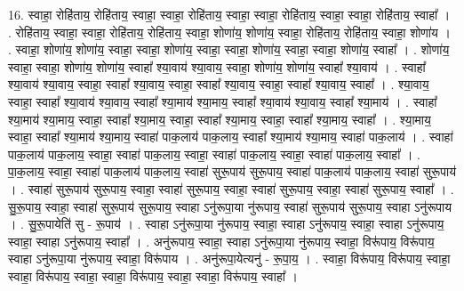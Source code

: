 \documentclass[17pt]{extarticle}
\begin{document}
16. स्वाहा॒ रोहि॑ताय॒ रोहि॑ताय॒ स्वाहा॒ स्वाहा॒ रोहि॑ताय॒ स्वाहा॒ स्वाहा॒ रोहि॑ताय॒ स्वाहा॒ स्वाहा॒ रोहि॑ताय॒ स्वाहा᳚ । . रोहि॑ताय॒ स्वाहा॒ स्वाहा॒ रोहि॑ताय॒ रोहि॑ताय॒ स्वाहा॒ शोणा॑य॒ शोणा॑य॒ स्वाहा॒ रोहि॑ताय॒ रोहि॑ताय॒ स्वाहा॒ शोणा॑य । . स्वाहा॒ शोणा॑य॒ शोणा॑य॒ स्वाहा॒ स्वाहा॒ शोणा॑य॒ स्वाहा॒ स्वाहा॒ शोणा॑य॒ स्वाहा॒ स्वाहा॒ शोणा॑य॒ स्वाहा᳚ । . शोणा॑य॒ स्वाहा॒ स्वाहा॒ शोणा॑य॒ शोणा॑य॒ स्वाहा᳚ श्या॒वाय॑ श्या॒वाय॒ स्वाहा॒ शोणा॑य॒ शोणा॑य॒ स्वाहा᳚ श्या॒वाय॑ । . स्वाहा᳚ श्या॒वाय॑ श्या॒वाय॒ स्वाहा॒ स्वाहा᳚ श्या॒वाय॒ स्वाहा॒ स्वाहा᳚ श्या॒वाय॒ स्वाहा॒ स्वाहा᳚ श्या॒वाय॒ स्वाहा᳚ । . श्या॒वाय॒ स्वाहा॒ स्वाहा᳚ श्या॒वाय॑ श्या॒वाय॒ स्वाहा᳚ श्या॒माय॑ श्या॒माय॒ स्वाहा᳚ श्या॒वाय॑ श्या॒वाय॒ स्वाहा᳚ श्या॒माय॑ । . स्वाहा᳚ श्या॒माय॑ श्या॒माय॒ स्वाहा॒ स्वाहा᳚ श्या॒माय॒ स्वाहा॒ स्वाहा᳚ श्या॒माय॒ स्वाहा॒ स्वाहा᳚ श्या॒माय॒ स्वाहा᳚ । . श्या॒माय॒ स्वाहा॒ स्वाहा᳚ श्या॒माय॑ श्या॒माय॒ स्वाहा॑ पाक॒लाय॑ पाक॒लाय॒ स्वाहा᳚ श्या॒माय॑ श्या॒माय॒ स्वाहा॑ पाक॒लाय॑ । . स्वाहा॑ पाक॒लाय॑ पाक॒लाय॒ स्वाहा॒ स्वाहा॑ पाक॒लाय॒ स्वाहा॒ स्वाहा॑ पाक॒लाय॒ स्वाहा॒ स्वाहा॑ पाक॒लाय॒ स्वाहा᳚ । . पा॒क॒लाय॒ स्वाहा॒ स्वाहा॑ पाक॒लाय॑ पाक॒लाय॒ स्वाहा॑ सुरू॒पाय॑ सुरू॒पाय॒ स्वाहा॑ पाक॒लाय॑ पाक॒लाय॒ स्वाहा॑ सुरू॒पाय॑ । . स्वाहा॑ सुरू॒पाय॑ सुरू॒पाय॒ स्वाहा॒ स्वाहा॑ सुरू॒पाय॒ स्वाहा॒ स्वाहा॑ सुरू॒पाय॒ स्वाहा॒ स्वाहा॑ सुरू॒पाय॒ स्वाहा᳚ । . सु॒रू॒पाय॒ स्वाहा॒ स्वाहा॑ सुरू॒पाय॑ सुरू॒पाय॒ स्वाहा ऽनु॑रूपा॒या नु॑रूपाय॒ स्वाहा॑ सुरू॒पाय॑ सुरू॒पाय॒ स्वाहा ऽनु॑रूपाय । . सु॒रू॒पायेति॑ सु - रू॒पाय॑ । . स्वाहा ऽनु॑रूपा॒या नु॑रूपाय॒ स्वाहा॒ स्वाहा ऽनु॑रूपाय॒ स्वाहा॒ स्वाहा ऽनु॑रूपाय॒ स्वाहा॒ स्वाहा ऽनु॑रूपाय॒ स्वाहा᳚ । . अनु॑रूपाय॒ स्वाहा॒ स्वाहा ऽनु॑रूपा॒या नु॑रूपाय॒ स्वाहा॒ विरू॑पाय॒ विरू॑पाय॒ स्वाहा ऽनु॑रूपा॒या नु॑रूपाय॒ स्वाहा॒ विरू॑पाय । . अनु॑रूपा॒येत्यनु॑ - रू॒पा॒य॒ । . स्वाहा॒ विरू॑पाय॒ विरू॑पाय॒ स्वाहा॒ स्वाहा॒ विरू॑पाय॒ स्वाहा॒ स्वाहा॒ विरू॑पाय॒ स्वाहा॒ स्वाहा॒ विरू॑पाय॒ स्वाहा᳚ । \newline
\end{document}
